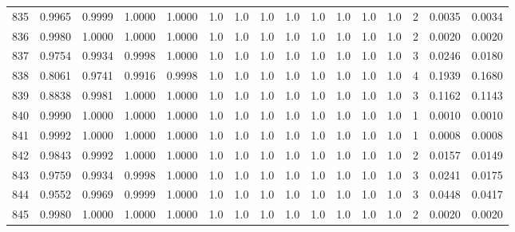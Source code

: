 \begin{tabular}{lrrrrrrrrrrrrrrr}
835 &      0.9965 &  0.9999 &  1.0000 &  1.0000 &     1.0 &     1.0 &     1.0 &     1.0 &     1.0 &     1.0 &      1.0 &        1.0 &      2 &                    0.0035 &                     0.0034 \\
836 &      0.9980 &  1.0000 &  1.0000 &  1.0000 &     1.0 &     1.0 &     1.0 &     1.0 &     1.0 &     1.0 &      1.0 &        1.0 &      2 &                    0.0020 &                     0.0020 \\
837 &      0.9754 &  0.9934 &  0.9998 &  1.0000 &     1.0 &     1.0 &     1.0 &     1.0 &     1.0 &     1.0 &      1.0 &        1.0 &      3 &                    0.0246 &                     0.0180 \\
838 &      0.8061 &  0.9741 &  0.9916 &  0.9998 &     1.0 &     1.0 &     1.0 &     1.0 &     1.0 &     1.0 &      1.0 &        1.0 &      4 &                    0.1939 &                     0.1680 \\
839 &      0.8838 &  0.9981 &  1.0000 &  1.0000 &     1.0 &     1.0 &     1.0 &     1.0 &     1.0 &     1.0 &      1.0 &        1.0 &      3 &                    0.1162 &                     0.1143 \\
840 &      0.9990 &  1.0000 &  1.0000 &  1.0000 &     1.0 &     1.0 &     1.0 &     1.0 &     1.0 &     1.0 &      1.0 &        1.0 &      1 &                    0.0010 &                     0.0010 \\
841 &      0.9992 &  1.0000 &  1.0000 &  1.0000 &     1.0 &     1.0 &     1.0 &     1.0 &     1.0 &     1.0 &      1.0 &        1.0 &      1 &                    0.0008 &                     0.0008 \\
842 &      0.9843 &  0.9992 &  1.0000 &  1.0000 &     1.0 &     1.0 &     1.0 &     1.0 &     1.0 &     1.0 &      1.0 &        1.0 &      2 &                    0.0157 &                     0.0149 \\
843 &      0.9759 &  0.9934 &  0.9998 &  1.0000 &     1.0 &     1.0 &     1.0 &     1.0 &     1.0 &     1.0 &      1.0 &        1.0 &      3 &                    0.0241 &                     0.0175 \\
844 &      0.9552 &  0.9969 &  0.9999 &  1.0000 &     1.0 &     1.0 &     1.0 &     1.0 &     1.0 &     1.0 &      1.0 &        1.0 &      3 &                    0.0448 &                     0.0417 \\
845 &      0.9980 &  1.0000 &  1.0000 &  1.0000 &     1.0 &     1.0 &     1.0 &     1.0 &     1.0 &     1.0 &      1.0 &        1.0 &      2 &                    0.0020 &                     0.0020 \\

\end{tabular}
